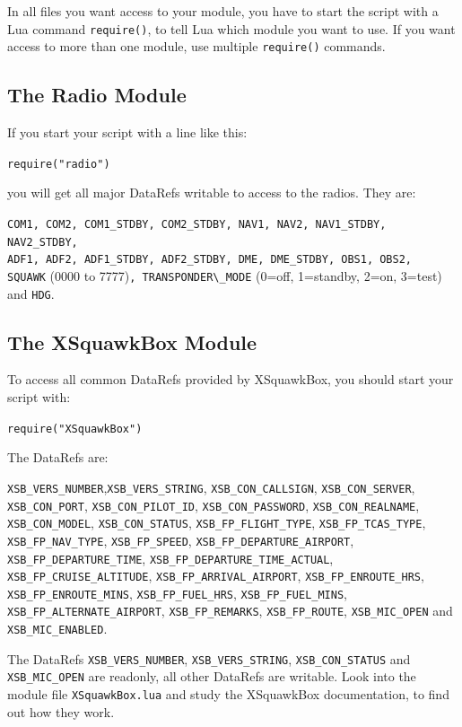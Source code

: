 \documentclass[11pt,parskip=half,a4paper]{scrartcl}
\begin{document}
In all files you want access to your module, you have to start the script with a Lua command \verb|require()|, to tell Lua which module you want to use. If you want access to more than one module, use multiple \verb|require()| commands.

\subsection{The Radio Module}

If you start your script with a line like this:

\verb|require("radio")|

you will get all major DataRefs writable to access to the radios. They are:

\verb|COM1, COM2, COM1_STDBY, COM2_STDBY, NAV1, NAV2, NAV1_STDBY, NAV2_STDBY,|\\
\verb|ADF1, ADF2, ADF1_STDBY, ADF2_STDBY, DME, DME_STDBY, OBS1, OBS2,|\\
\verb|SQUAWK| (0000 to 7777)\verb|, TRANSPONDER\_MODE| (0=off, 1=standby, 2=on, 3=test) and \verb|HDG|.

\subsection{The XSquawkBox Module}

To access all common DataRefs provided by XSquawkBox, you should start your script with:

\verb|require("XSquawkBox")|

The DataRefs are:

\begin{flushleft}
\verb|XSB_VERS_NUMBER|,\verb|XSB_VERS_STRING|, \verb|XSB_CON_CALLSIGN|, \verb|XSB_CON_SERVER|, \verb|XSB_CON_PORT|, \verb|XSB_CON_PILOT_ID|, \verb|XSB_CON_PASSWORD|, \verb|XSB_CON_REALNAME|, \verb|XSB_CON_MODEL|, \verb|XSB_CON_STATUS|, \verb|XSB_FP_FLIGHT_TYPE|, \verb|XSB_FP_TCAS_TYPE|, \verb|XSB_FP_NAV_TYPE|, \verb|XSB_FP_SPEED|, \verb|XSB_FP_DEPARTURE_AIRPORT|, \verb|XSB_FP_DEPARTURE_TIME|, \verb|XSB_FP_DEPARTURE_TIME_ACTUAL|, \verb|XSB_FP_CRUISE_ALTITUDE|, \verb|XSB_FP_ARRIVAL_AIRPORT|, \verb|XSB_FP_ENROUTE_HRS|, \verb|XSB_FP_ENROUTE_MINS|, \verb|XSB_FP_FUEL_HRS|, \verb|XSB_FP_FUEL_MINS|, \verb|XSB_FP_ALTERNATE_AIRPORT|, \verb|XSB_FP_REMARKS|, \verb|XSB_FP_ROUTE|, \verb|XSB_MIC_OPEN| and \verb|XSB_MIC_ENABLED|.
\end{flushleft}

The DataRefs \verb|XSB_VERS_NUMBER|, \verb|XSB_VERS_STRING|, \verb|XSB_CON_STATUS| and \verb|XSB_MIC_OPEN| are readonly, all other DataRefs are  writable. Look into the module file \verb|XSquawkBox.lua| and study the XSquawkBox documentation, to find out how they work.
\end{document}
